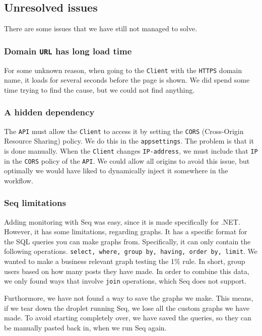\subsection{Unresolved issues}

There are some issues that we have still not managed to solve.

\subsubsection{Domain \texttt{URL} has long load time}

For some unknown reason, when going to the \texttt{Client} with the \texttt{HTTPS} domain name, 
it loads for several seconds before the page is shown.
We did spend some time trying to find the cause,
but we could not find anything.

\subsubsection{A hidden dependency}

The \texttt{API} must allow the \texttt{Client} to access it by 
setting the \texttt{CORS} (Cross-Origin Resource Sharing) policy.
We do this in the \texttt{appsettings}. The problem is that it is done manually.
When the \texttt{Client} changes \texttt{IP-address}, we must include 
that \texttt{IP} in the \texttt{CORS} policy of the \texttt{API}.
We could allow all origins to avoid this issue, 
but optimally we would have liked to dynamically 
inject it somewhere in the workflow.

\subsubsection{Seq limitations}

Adding monitoring with Seq was easy, since it is made specifically for .NET.
However, it has some limitations, regarding graphs.
It has a specific format for the SQL queries you can make graphs from.
Specifically, it can only contain the following operations.
\texttt{select, where, group by, having, order by, limit}.
We wanted to make a business relevant graph testing the 1\% rule\cite{1_perc_rule}.
In short, group users based on how many posts they have made.
In order to combine this data, we only found ways that involve 
\texttt{join} operations, which Seq does not support.

Furthormore, we have not found a way to save the graphs we make.
This means, if we tear down the droplet running Seq,
we lose all the custom graphs we have made.
To avoid starting completely over, we have saved the queries,
so they can be manually pasted back in, when we run Seq again.


